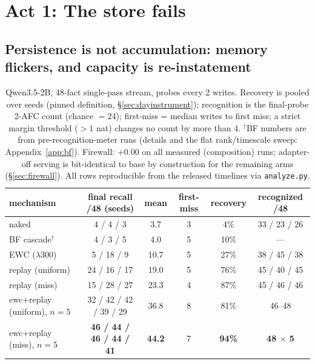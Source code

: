 \documentclass[11pt]{article}
\newcommand{\qwen}{Qwen3.5-2B}
\begin{document}
\section{Act 1: The store fails}\label{sec:act1}

\subsection{Persistence is not accumulation: memory flickers, and capacity is re-instatement}
\label{sec:reinstatement}

\begin{table}[t]
\centering\small
\setlength{\tabcolsep}{4pt}
\begin{tabular}{lccccc}
\toprule
mechanism & final recall /48 (seeds) & mean & first-miss & recovery & recognized /48 \\
\midrule
naked            & 4 / 4 / 3    & 3.7  & 3   & 4\%  & 33 / 23 / 26 \\
BF cascade$^\dagger$ & 4 / 3 / 5 & 4.0 & 5   & 10\% & --- \\
EWC ($\lambda$300) & 5 / 18 / 9 & 10.7 & 5   & 27\% & 38 / 45 / 38 \\
replay (uniform) & 24 / 16 / 17 & 19.0 & 5   & 76\% & 45 / 40 / 45 \\
replay (miss)    & 15 / 28 / 27 & 23.3 & 4   & 87\% & 45 / 46 / 46 \\
ewc+replay (uniform), $n{=}5$ & 32 / 42 / 42 / 39 / 29 & 36.8 & 8 & 81\% & 46--48 \\
ewc+replay (miss), $n{=}5$ & \textbf{46 / 44 / 46 / 44 / 41} & \textbf{44.2} & 7 & \textbf{94\%} & \textbf{48 $\times$ 5} \\
\bottomrule
\end{tabular}
\caption{\qwen{}, 48-fact single-pass stream, probes every 2 writes. Recovery is pooled over
seeds (pinned definition, \S\ref{sec:dayinstrument}); recognition is the final-probe 2-AFC count
(chance $=24$); first-miss = median writes to first miss; a strict margin threshold ($>1$ nat)
changes no count by more than 4.
$^\dagger$BF numbers are from pre-recognition-meter runs (details and the flat rank/timescale
sweep: Appendix~\ref{app:bf}). Firewall: $+0.00$ on all measured (composition) runs; adapter-off
serving is bit-identical to base by construction for the remaining arms (\S\ref{sec:firewall}).
All rows reproducible from the released timelines via \texttt{analyze.py}.}
\label{tab:main}
\end{table}
\end{document}
